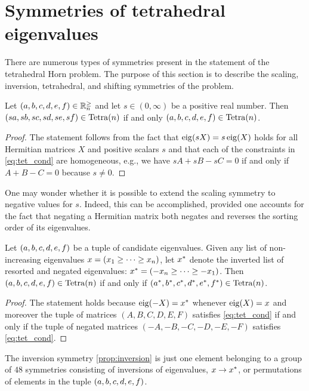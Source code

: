 \documentclass[notitlepage, 11pt, letterpaper]{amsart}
\begin{document}
\section{Symmetries of tetrahedral eigenvalues}
\label{sec:symmetries}

There are numerous types of symmetries present in the statement of the tetrahedral Horn problem.
The purpose of this section is to describe the scaling, inversion, tetrahedral, and shifting symmetries of the problem.

\begin{prop}[Scaling]
    \label{prop:scaling}
    Let $(a, b, c, d, e, f) \in \mathbb R^{\geq}_{n}$ and let $s \in (0, \infty)$ be a positive real number.
    Then $(sa, sb, sc, sd, se, sf) \in \operatorname{Tetra}(n)$ if and only $(a, b, c, d, e, f) \in \operatorname{Tetra}(n)$.
\end{prop}
\begin{proof}
    The statement follows from the fact that $\operatorname{eig}(s X) = s \operatorname{eig}(X)$ holds for all Hermitian matrices $X$ and positive scalars $s$ and that each of the constraints in \cref{eq:tet_cond} are homogeneous, e.g., we have $sA+sB-sC=0$ if and only if $A+B-C=0$ because $s \neq 0$.
\end{proof}

One may wonder whether it is possible to extend the scaling symmetry to negative values for $s$.
Indeed, this can be accomplished, provided one accounts for the fact that negating a Hermitian matrix both negates and reverses the sorting order of its eigenvalues.
\begin{prop}[Inversion]
    \label{prop:inversion}
    Let $(a, b, c, d, e, f)$ be a tuple of candidate eigenvalues.
    Given any list of non-increasing eigenvalues $x = (x_1 \geq \cdots \geq x_n)$, let $x^{*}$ denote the inverted list of resorted and negated eigenvalues: $x^{*} = (-x_n \geq \cdots \geq - x_1)$.
    Then $(a, b, c, d, e, f) \in \operatorname{Tetra}(n)$ if and only if $(a^{*}, b^{*}, c^{*}, d^{*}, e^{*}, f^{*}) \in \operatorname{Tetra}(n)$.
\end{prop}
\begin{proof}
    The statement holds because $\operatorname{eig}(-X) = x^{*}$ whenever $\operatorname{eig}(X) = x$ and moreover the tuple of matrices $(A,B,C,D,E,F)$ satisfies \cref{eq:tet_cond} if and only if the tuple of negated matrices $(-A,-B,-C,-D,-E,-F)$ satisfies \cref{eq:tet_cond}.
\end{proof}

The inversion symmetry \cref{prop:inversion} is just one element belonging to a group of $48$ symmetries consisting of inversions of eigenvalues, $x \rightarrow x^{*}$, or permutations of elements in the tuple $(a,b,c,d,e,f)$.
\end{document}
